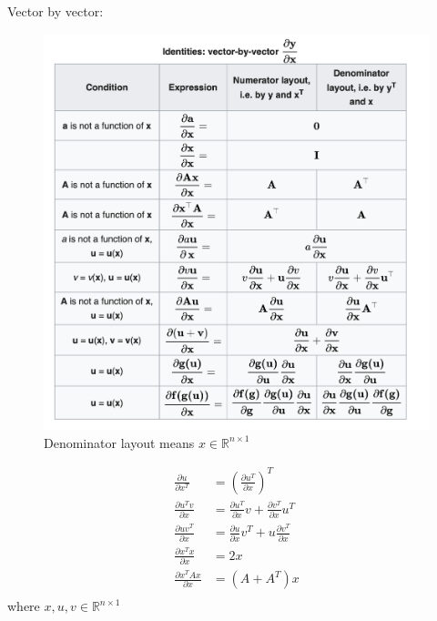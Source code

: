 \documentclass[11pt,a4paper]{article}
\begin{document}
Vector by vector:
\begin{center}\begin{figure}[htbp]
    \centering
    \includegraphics[scale=0.25]{vector_by_vector.png}
    \caption{Denominator layout means $x\in\mathbb{R}^{n\times 1}$}
    \label{}
\end{figure}\end{center}

\begin{equation}
    \begin{aligned}
        \frac{\partial u}{\partial x^T}&=(\frac{\partial u^T}{\partial x})^T\\
        \frac{\partial u^Tv}{\partial x}&=\frac{\partial u^T}{\partial x}v+\frac{\partial v^T}{\partial x}u^T\\
        \frac{\partial uv^T}{\partial x}&=\frac{\partial u}{\partial x}v^T+u\frac{\partial v^T}{\partial x}\\
        \frac{\partial x^Tx}{\partial x}&=2x\\
        \frac{\partial x^TAx}{\partial x}&=(A+A^T)x\\
    \end{aligned}
    \nonumber
\end{equation}
where $x,u,v\in \mathbb{R}^{n\times 1}$
\end{document}
